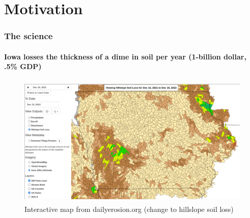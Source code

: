 \documentclass{snedecorbeamer}
\begin{document}
\section{Motivation}

\begin{frame}
  \frametitle{The science}
  \framesubtitle{Iowa losses the thickness of a dime in soil per year (1-billion
    dollar, .5\% GDP)}

  \begin{figure}
    \centering
    \includegraphics[height=17em]{inc/dep_soilloss_map_20221215_168.png}
      \caption*{%
        \href{https://bit.ly/3HZyaRl}{}
        Interactive map from dailyerosion.org (change to hillslope soil loss)}
  \end{figure}
\end{frame}
\end{document}
